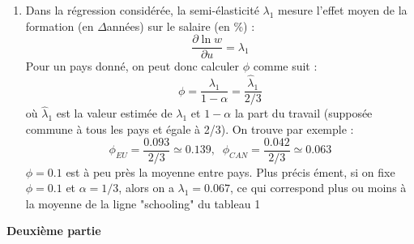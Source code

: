 \documentclass[a4paper,11pt]{article}
\begin{document}
\begin{enumerate}
\item Dans la r\'{e}gression consid\'{e}r\'{e}e, la semi-\'{e}lasticit\'{e} $%
\lambda _{1}$ mesure l'effet moyen de la formation (en $\Delta $ann\'{e}es)
sur le salaire (en \%) :%
\begin{equation*}
\frac{\partial \ln w}{\partial u}=\lambda _{1}
\end{equation*}%
Pour un pays donn\'{e}, on peut donc calculer $\phi $ comme suit :%
\begin{equation*}
\phi =\frac{\lambda _{1}}{1-\alpha }=\frac{\hat{\lambda}_{1}}{2/3}
\end{equation*}%
o\`{u} $\hat{\lambda}_{1}$ est la valeur estim\'{e}e de $\lambda _{1}$ et $%
1-\alpha $ la part du travail (suppos\'{e}e commune \`{a} tous les pays et 
\'{e}gale \`{a} 2/3). On trouve par exemple :%
\begin{equation*}
\phi _{EU}=\frac{0.093}{2/3}\simeq 0.139,\;\;\phi _{CAN}=\frac{0.042}{2/3}%
\simeq 0.063
\end{equation*}%
$\phi =0.1$ est \`{a} peu pr\`{e}s la moyenne entre pays. Plus pr\'{e}cis%
\'{e}ment, si on fixe $\phi =0.1$ et $\alpha =1/3$, alors on a $\lambda
_{1}=0.067$, ce qui correspond plus ou moins \`{a} la moyenne de la ligne
"schooling" du tableau 1
\end{enumerate}

\bigskip

\noindent \textbf{Deuxi\`{e}me partie}

\bigskip
\end{document}
